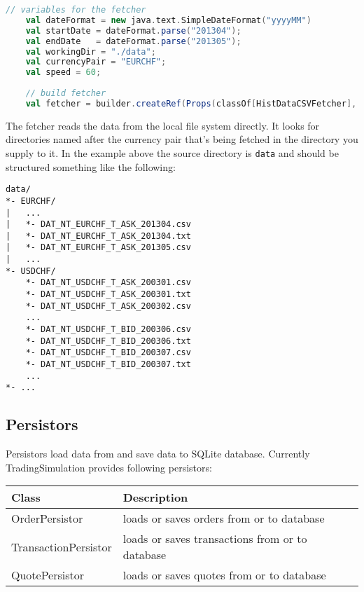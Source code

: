\begin{lstlisting}[language=Scala]
    // variables for the fetcher
    val dateFormat = new java.text.SimpleDateFormat("yyyyMM")
    val startDate = dateFormat.parse("201304");
    val endDate   = dateFormat.parse("201305");
    val workingDir = "./data";
    val currencyPair = "EURCHF";
    val speed = 60;
    
    // build fetcher
    val fetcher = builder.createRef(Props(classOf[HistDataCSVFetcher], workingDir, currencyPair, startDate, endDate, speed),"HistFetcher")    
\end{lstlisting}

The fetcher reads the data from the local file system directly. It looks for directories named after the currency pair that's being fetched in the directory you supply to it. In the example above the source directory is \lstinline|data| and should be structured something like the following:

\begin{lstlisting}
data/
*- EURCHF/
|   ...
|   *- DAT_NT_EURCHF_T_ASK_201304.csv
|   *- DAT_NT_EURCHF_T_ASK_201304.txt
|   *- DAT_NT_EURCHF_T_ASK_201305.csv
|   ...
*- USDCHF/
    *- DAT_NT_USDCHF_T_ASK_200301.csv
    *- DAT_NT_USDCHF_T_ASK_200301.txt
    *- DAT_NT_USDCHF_T_ASK_200302.csv
    ...
    *- DAT_NT_USDCHF_T_BID_200306.csv
    *- DAT_NT_USDCHF_T_BID_200306.txt
    *- DAT_NT_USDCHF_T_BID_200307.csv
    *- DAT_NT_USDCHF_T_BID_200307.txt
    ...
*- ...
\end{lstlisting}

\subsection{Persistors}

Persistors load data from and save data to SQLite database. Currently TradingSimulation provides following persistors:

\noindent
\begin{tabularx}{\textwidth}{|l|X|}
  \hline
  Class & Description  \\
  \hline
  OrderPersistor & loads or saves orders from or to database \\
  \hline
  TransactionPersistor  & loads or saves transactions from or to database  \\
  \hline
  QuotePersistor & loads or saves quotes from or to database  \\
  \hline
\end{tabularx}\\[0.3cm]

